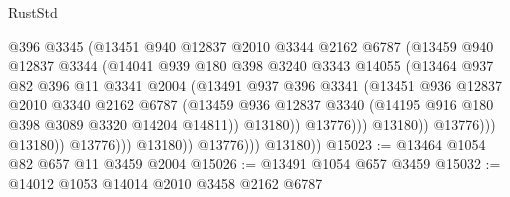 \begin{lexlean}{RustStd}
\begin{coremodule}
                                    @396
                                    @3345
                                    (@13451
                                      @940
                                      @12837
                                      @2010
                                      @3344
                                      @2162
                                      @6787
                                      (@13459
                                        @940
                                        @12837
                                        @3344
                                        (@14041
                                          @939
                                          @180
                                          @398
                                          @3240
                                          @3343
                                          @14055
                                          (@13464
                                            @937
                                            @82
                                            @396
                                            @11
                                            @3341
                                            @2004
                                            (@13491
                                              @937
                                              @396
                                              @3341
                                              (@13451
                                                @936
                                                @12837
                                                @2010
                                                @3340
                                                @2162
                                                @6787
                                                (@13459
                                                  @936
                                                  @12837
                                                  @3340
                                                  (@14195 @916 @180 @398 @3089 @3320 @14204 @14811))
                                                @13180))
                                            @13776)))
                                      @13180))
                                  @13776)))
                            @13180))
                        @13776)))
                  @13180))
              @13776)))
        @13180))
@15023 := @13464 @1054 @82 @657 @11 @3459 @2004
@15026 := @13491 @1054 @657 @3459
@15032 := @14012 @1053 @14014 @2010 @3458 @2162 @6787

\end{coremodule}
\end{lexlean}
